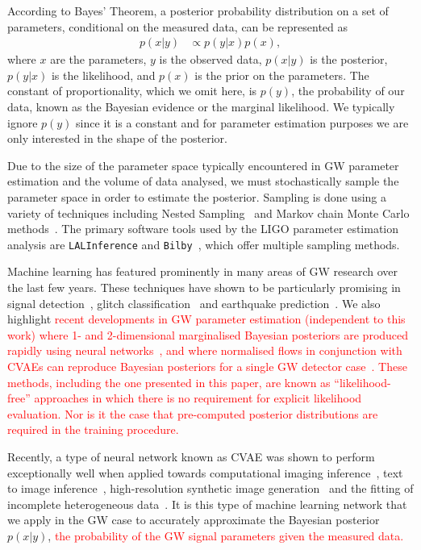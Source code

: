 \documentclass[%
showpacs,
nofootinbib,
 amsmath,amssymb,
 aps,
 twocolumn,
 prl,
 reprint,
floatfix,
]{revtex4-1}
\newcommand{\new}[1]{\textcolor{red}{#1}}
\begin{document}
%
%
According to Bayes' Theorem, a posterior probability distribution on a set of
parameters, conditional on the measured data, can be represented as
%
\begin{align}\label{eq:bayes_theorem} 
p(x|y) &\propto p(y|x) p(x), 
\end{align}
%
where $x$ are the parameters, $y$ is the observed data, $p(x|y)$ is the
posterior, $p(y|x)$ is the likelihood, and $p(x)$ is the prior on the
parameters. The constant of proportionality, which we omit here, is
$p(y)$, the probability of our data, known as the Bayesian evidence or the
marginal likelihood. We typically ignore $p(y)$ since it is a constant and for
parameter estimation purposes we are only interested in the shape of the
posterior.

%
%
Due to the size of the parameter space typically encountered in \ac{GW}
parameter estimation and the volume of data analysed, we must stochastically
sample the parameter space in order to estimate the posterior.  Sampling is
done using a variety of techniques including Nested
Sampling~\cite{skilling2006,cpnest,dynesty} and Markov chain Monte Carlo
methods~\cite{emcee,ptemcee}. The primary software tools used by the \ac{LIGO}
parameter estimation analysis are \texttt{LALInference} and
\texttt{Bilby}~\cite{1409.7215,1811.02042}, which offer multiple sampling
methods.  
  
%
%
Machine learning has featured prominently in many areas of \ac{GW} research
over the last few years. These techniques have shown to be particularly
promising in signal
detection~\cite{GEORGE201864,PhysRevLett.120.141103,GebKilParHarSch}, glitch
classification~\cite{0264-9381-34-6-064003} and earthquake
prediction~\cite{Coughlin_2017}. We also highlight \new{recent developments in
\ac{GW} parameter estimation (independent to this work) where 1- and
2-dimensional marginalised Bayesian posteriors are produced rapidly using
neural networks~\cite{2019arXiv190905966C}, and where normalised flows in
conjunction with \acp{CVAE} can reproduce Bayesian posteriors for a single
\ac{GW} detector case~\cite{2020arXiv200207656G}. These methods, including the
one presented in this paper, are known as ``likelihood-free'' approaches in which
there is no requirement for explicit likelihood evaluation. Nor is it the case
that pre-computed posterior distributions are required in the training
procedure.}

%
%
Recently, a type of neural network known as \ac{CVAE} was shown to perform
exceptionally well when applied towards computational imaging
inference~\cite{1904.06264,NIPS2015_5775}, text to image
inference~\cite{1512.00570}, high-resolution synthetic image
generation~\cite{1612.00005} and the fitting of incomplete heterogeneous
data~\cite{1807.03653}. It is this type of machine learning network that we
apply in the \ac{GW} case to accurately approximate the Bayesian posterior
$p(x|y)$, \new{the probability of the \ac{GW} signal parameters given the
measured data.} 
\end{document}
